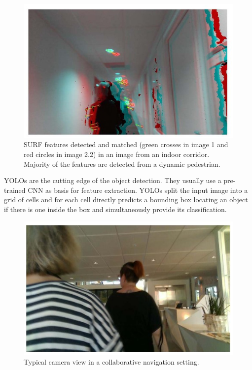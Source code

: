\begin{figure}
    \centering
    \includegraphics{f2.jpg}
    \caption{SURF features detected and matched (green crosses in image
1 and red circles in image 2.2) in an image from an indoor corridor. Majority
of the features are detected from a dynamic pedestrian.}
    
\end{figure}
YOLOs are
the cutting edge of the object detection. They usually use a
pre-trained CNN as basis for feature extraction. YOLOs split
the input image into a grid of cells and for each cell directly
predicts a bounding box locating an object if there is one inside
the box and simultaneously provide its classification.\\
\begin{figure}
    \centering
    \includegraphics{fig3.jpg}
    \caption{Typical camera view in a collaborative navigation setting.}
    
\end{figure}
